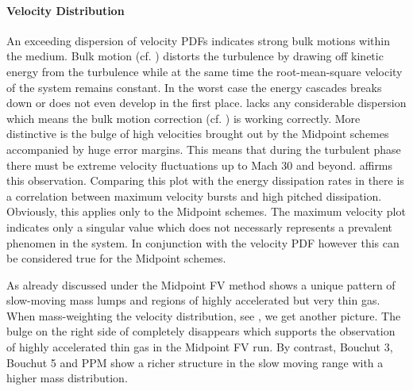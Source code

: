 \paragraph{Velocity Distribution}
An exceeding dispersion of velocity PDFs indicates strong bulk motions within
the medium. Bulk motion (cf. ) distorts the turbulence by
drawing off kinetic energy from the turbulence while at the same time the
root-mean-square velocity of the system remains constant. In the worst case the
energy cascades breaks down or does not even develop in the first place.
 lacks any considerable
dispersion which means the bulk motion correction (cf.
) is working correctly. More distinctive is
the bulge of high velocities brought out by the Midpoint schemes
accompanied by huge error margins. This means that during the turbulent phase
there must be extreme velocity fluctuations up to Mach 30 and beyond.
 affirms this observation.
Comparing this plot with the energy dissipation rates in
 there is a correlation
between maximum velocity bursts and high pitched dissipation. Obviously, this
applies only to the Midpoint schemes. The maximum velocity plot indicates only
a singular value which does not necessarly represents a prevalent phenomen in
the system. In conjunction with the velocity PDF however this can be considered
true for the Midpoint schemes.

As already discussed under  the Midpoint FV method
shows a unique pattern of slow-moving mass lumps and regions of highly
accelerated but very thin gas. When mass-weighting the velocity distribution,
see , we get another picture.
The bulge on the right side of 
completely disappears which supports the observation of highly accelerated thin
gas in the Midpoint FV run. By contrast, Bouchut 3, Bouchut 5 and PPM show
a richer structure in the slow moving range with a higher mass distribution.

